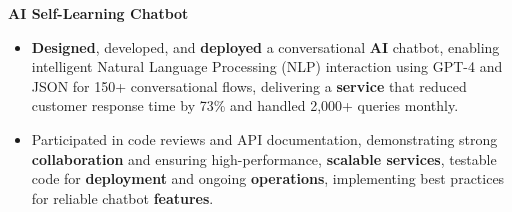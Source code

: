\documentclass[a4paper,10pt]{article}
\begin{document}
\vspace{-2mm}
\textbf{AI Self-Learning Chatbot} \\
\begin{itemize}[leftmargin=*, itemsep=0pt, parsep=1pt]
\vspace{-7mm}
    \item \textbf{Designed}, developed, and \textbf{deployed} a conversational \textbf{AI} chatbot, enabling intelligent Natural Language Processing (NLP) interaction using GPT-4 and JSON for 150+ conversational flows, delivering a \textbf{service} that reduced customer response time by 73\% and handled 2,000+ queries monthly.
    \item Participated in code reviews and API documentation, demonstrating strong \textbf{collaboration} and ensuring high-performance, \textbf{scalable services}, testable code for \textbf{deployment} and ongoing \textbf{operations}, implementing best practices for reliable chatbot \textbf{features}.
\end{itemize}

\vspace{-2mm}
\end{document}
